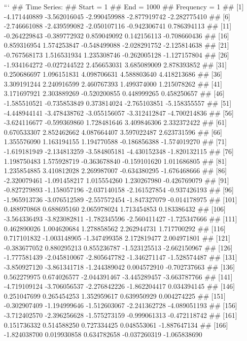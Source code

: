 \documentclass[
]{article}
\begin{document}
\begin{enumerate}[label=(\alph*)]
```
## Time Series:
## Start = 1 
## End = 1000 
## Frequency = 1 
##    [1] -4.171440889 -3.562016045 -2.990459988 -2.877919742 -2.282775410
##    [6] -2.746661088 -2.439599082 -2.050107116 -0.942306741  0.786394113
##   [11] -0.264229843 -0.389772932  0.859049092  0.142156113 -0.708660436
##   [16]  0.859316954  1.574253847 -0.548499088 -2.028291752 -2.125814638
##   [21] -0.767568173  1.516531934  1.235308746 -0.262005128 -1.127157804
##   [26] -1.934164272 -0.027244522  2.456653031  3.685089009  2.878393852
##   [31]  0.250686697  1.096151831  4.098706631  4.588803640  4.418213686
##   [36]  3.309191244  2.240916599  2.460767393  1.499374000  1.215078262
##   [41]  3.171697921  2.303889269 -0.520200855  0.448999265  0.458250657
##   [46] -1.585510521 -0.735853849  0.373814024 -2.765103851 -5.158355557
##   [51] -4.448944141 -3.478438762 -3.055156057 -3.312412847 -4.700214836
##   [56] -3.624116677 -0.599369860  1.728481646  3.409846306  2.332372422
##   [61]  0.670533307  2.852462662  4.087664407  3.597022487  2.623731596
##   [66]  1.355576090  1.163194155  1.194770588 -0.186856388 -1.574019270
##   [71] -1.619181949 -2.134813259 -3.584805181 -4.430152348 -1.820132115
##   [76]  1.198750483  1.575928719 -0.363678840 -0.159101620  1.011686805
##   [81]  1.235854885  3.410812028  2.269987007 -0.634380295 -1.676468666
##   [86] -2.320079461 -1.091458217  1.015554260  1.230267980 -0.426769079
##   [91] -0.827279893 -1.158057196 -2.037140158 -2.161527854 -0.937426193
##   [96] -1.965913736 -3.076512589 -2.557572454 -1.847327079 -0.014178975
##  [101]  0.488970868  0.688695160  2.065978024  1.713454853  0.183386432
##  [106] -3.564336493 -3.823082811 -1.782345596 -2.560411427 -1.725347666
##  [111]  0.462890026  1.004620684  1.278858562  2.262944731  1.717700292
##  [116]  0.717101832 -1.003148905 -1.347499358  2.172819477  2.004971801
##  [121] -0.383677052  0.880295213  0.855236787 -1.523125513 -2.662150967
##  [126] -1.777581439 -2.045810067 -2.805647782 -1.346271147 -1.528574487
##  [131] -3.850927120 -3.861341718 -1.244389042  0.004572910 -0.702737663
##  [136]  0.562279975  0.674026577 -2.044391467 -3.445289457 -3.663787766
##  [141] -4.719109124 -3.706056537 -2.276842226 -1.862204417  0.034394145
##  [146]  0.251047699  0.265454253  1.352959617  0.639950929  0.004274225
##  [151] -0.302907409 -1.194999646 -1.512603067 -2.241362728 -4.089051193
##  [156] -3.712402570 -2.396256628 -1.575273159 -0.999061313 -0.472118742
##  [161]  0.151736332  0.514588250  0.727334425  0.048553061 -1.887647134
##  [166] -1.824038700  0.019930858  0.634782658 -0.037260319 -1.065838690

\end{enumerate}
\end{document}

